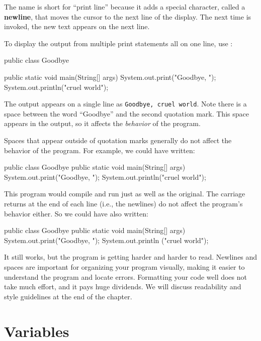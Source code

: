 
The name  is short for ``print line'' because it adds a special character, called a {\bf newline}, that moves the cursor to the next line of the display.
The next time  is invoked, the new text appears on the next line.


To display the output from multiple print statements all on one line, use :

\begin{code}
public class Goodbye {

    public static void main(String[] args) {
        System.out.print("Goodbye, ");
        System.out.println("cruel world");
    }

}
\end{code}

The output appears on a single line as {\tt Goodbye, cruel world}.
Note there is a space between the word ``Goodbye'' and the second quotation mark.
This space appears in the output, so it affects the {\em behavior} of the program.

Spaces that appear outside of quotation marks generally do not affect the behavior of the program.
For example, we could have written:

\begin{code}
public class Goodbye {
public static void main(String[] args) {
System.out.print("Goodbye, ");
System.out.println("cruel world");
}
}
\end{code}

This program would compile and run just as well as the original.
The carriage returns at the end of each line (i.e., the newlines) do not affect the program's behavior either.
So we could have also written:

\begin{code}
public class Goodbye { public static void main(String[] args) {
System.out.print("Goodbye, "); System.out.println
("cruel world");}}
\end{code}

It still works, but the program is getting harder and harder to read.
Newlines and spaces are important for organizing your program visually, making it easier to understand the program and locate errors.
Formatting your code well does not take much effort, and it pays huge dividends.
We will discuss readability and style guidelines at the end of the chapter.

\section {Variables}

